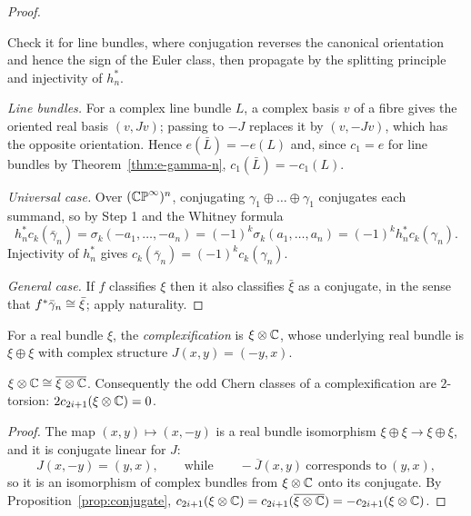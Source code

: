 \begin{proof}
\begin{strategy}
Check it for line bundles, where conjugation reverses the canonical orientation
and hence the sign of the Euler class, then propagate by the splitting principle
and injectivity of $h_n^*$.
\end{strategy}

 \emph{Line bundles.} For a complex line bundle $L$, a complex basis $v$
of a fibre gives the oriented real basis $(v,Jv)$; passing to $-J$ replaces it
by $(v,-Jv)$, which has the opposite orientation. Hence
$e(\bar L)=-e(L)$ and, since $c_1=e$ for line bundles by
Theorem~\ref{thm:e-gamma-n}, $c_1(\bar L)=-c_1(L)$.

 \emph{Universal case.} Over $(\mathbb{CP}^\infty)^n$, conjugating
$\gamma_1\oplus\dots\oplus\gamma_1$ conjugates each summand, so by Step 1 and
the Whitney formula
\[
h_n^*c_k(\bar\gamma_n)=\sigma_k(-a_1,\dots,-a_n)=(-1)^k\sigma_k(a_1,\dots,a_n)
=(-1)^k h_n^*c_k(\gamma_n).
\]
Injectivity of $h_n^*$ gives $c_k(\bar\gamma_n)=(-1)^kc_k(\gamma_n)$.

 \emph{General case.} If $f$ classifies $\xi$ then it also classifies
$\bar\xi$ as a conjugate, in the sense that $f^*\bar\gamma_n\cong\bar\xi$; apply
naturality.
\end{proof}

\begin{definition}
For a real bundle $\xi$, the \emph{complexification} is
$\xi\otimes\mathbb{C}$, whose underlying real bundle is $\xi\oplus\xi$ with complex
structure $J(x,y)=(-y,x)$.
\end{definition}

\begin{lemma}\label{lem:complexification-selfconj}
$\xi\otimes\mathbb{C}\cong\overline{\xi\otimes\mathbb{C}}$. Consequently the odd Chern classes of
a complexification are $2$-torsion:
$2c_{2i+1}(\xi\otimes\mathbb{C})=0$.
\end{lemma}

\begin{proof}
The map $(x,y)\mapsto(x,-y)$ is a real bundle isomorphism
$\xi\oplus\xi\to\xi\oplus\xi$, and it is conjugate linear for $J$:
\[
J(x,-y)=(y,x),
\qquad\text{while}\qquad
-\overline{J}(x,y)\ \text{corresponds to}\ (y,x),
\]
so it is an isomorphism of complex bundles from $\xi\otimes\mathbb{C}$ onto its
conjugate. By Proposition~\ref{prop:conjugate},
$c_{2i+1}(\xi\otimes\mathbb{C})=c_{2i+1}(\overline{\xi\otimes\mathbb{C}})
=-c_{2i+1}(\xi\otimes\mathbb{C})$.
\end{proof}

